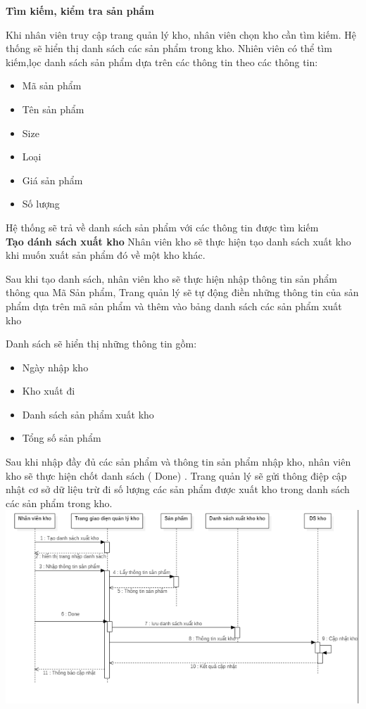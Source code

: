 \documentclass{article}
\begin{document}
\fontsize{14}{20}\selectfont\textbf{Tìm kiếm, kiểm tra sản phẩm }

Khi nhân viên truy cập trang quản lý kho, nhân viên chọn kho cần tìm kiếm. Hệ thống sẽ hiển thị danh sách các sản phẩm trong kho. Nhiên viên có thể tìm kiếm,lọc danh sách sản phẩm dựa trên các thông tin theo các thông tin:
    \begin{itemize}
        \item Mã sản phẩm
        \item Tên sản phẩm
        \item Size
        \item Loại
        \item Giá sản phẩm
        \item Số lượng
    \end{itemize}
Hệ thống sẽ trả về danh sách sản phẩm với các thông tin được tìm kiếm \\

\fontsize{14}{20}\selectfont\textbf{Tạo dánh sách xuất kho}
Nhân viên kho sẽ thực hiện tạo danh sách xuất kho khi muốn xuất sản phẩm đó về một kho khác.

Sau khi tạo danh sách, nhân viên kho sẽ thực hiện nhập thông tin sản phẩm thông qua  Mã Sản phẩm, Trang quản lý sẽ tự động điền những thông tin của sản phẩm dựa trên mã sản phẩm và thêm vào bảng danh sách các sản phẩm xuất kho 

Danh sách sẽ hiển thị những thông tin gồm: 
    
    \begin{itemize}
        \item Ngày nhập kho
        \item Kho xuất đi
        \item Danh sách sản phẩm xuất kho
        \item Tổng số sản phẩm
    \end{itemize}
Sau khi nhập đầy đủ các sản phẩm và thông tin sản phẩm nhập kho, nhân viên kho sẽ thực hiện chốt danh sách ( Done) . Trang quản lý sẽ gửi thông điệp cập nhật cơ sở dữ liệu  trừ đi số lượng các sản phẩm được xuất kho trong danh sách các sản phẩm trong kho.\\

\includegraphics[scale = 0.5]{20.png}
\end{document}
